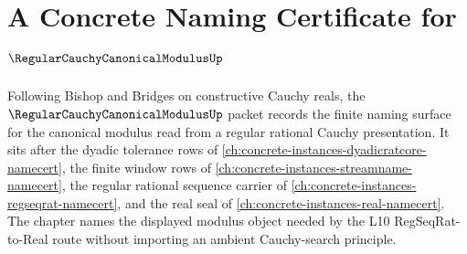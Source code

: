 \chapter{A Concrete Naming Certificate for $\RegularCauchyCanonicalModulusUp$}
\label{ch:concrete-instances-regular-cauchy-canonical-modulus-namecert}

Following Bishop and Bridges on constructive Cauchy reals, the $\RegularCauchyCanonicalModulusUp$ packet records the finite naming surface for the canonical modulus read from a regular rational Cauchy presentation. It sits after the dyadic tolerance rows of \autoref{ch:concrete-instances-dyadicratcore-namecert}, the finite window rows of \autoref{ch:concrete-instances-streamname-namecert}, the regular rational sequence carrier of \autoref{ch:concrete-instances-regseqrat-namecert}, and the real seal of \autoref{ch:concrete-instances-real-namecert}. The chapter names the displayed modulus object needed by the L10 RegSeqRat-to-Real route without importing an ambient Cauchy-search principle.

